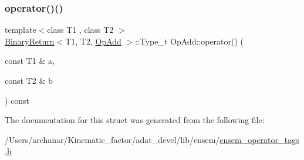 \mbox{\label{structOpAdd_a1eeb43f9d50d80994b1d2fe141bca73b}} 
\subsubsection{\texorpdfstring{operator()()}{operator()()}\hspace{0.1cm}{\footnotesize\ttfamily [2/2]}}
{\footnotesize\ttfamily template$<$class T1 , class T2 $>$ \\
\mbox{\hyperlink{structBinaryReturn}{Binary\+Return}}$<$T1, T2, \mbox{\hyperlink{structOpAdd}{Op\+Add}} $>$\+::Type\+\_\+t Op\+Add\+::operator() (\begin{DoxyParamCaption}\item[{const T1 \&}]{a,  }\item[{const T2 \&}]{b }\end{DoxyParamCaption}) const\hspace{0.3cm}{\ttfamily [inline]}}



The documentation for this struct was generated from the following file\+:\begin{DoxyCompactItemize}
\item 
/\+Users/archanar/\+Kinematic\+\_\+factor/adat\+\_\+devel/lib/ensem/\mbox{\hyperlink{lib_2ensem_2ensem__operator__tags_8h}{ensem\+\_\+operator\+\_\+tags.\+h}}\end{DoxyCompactItemize}

